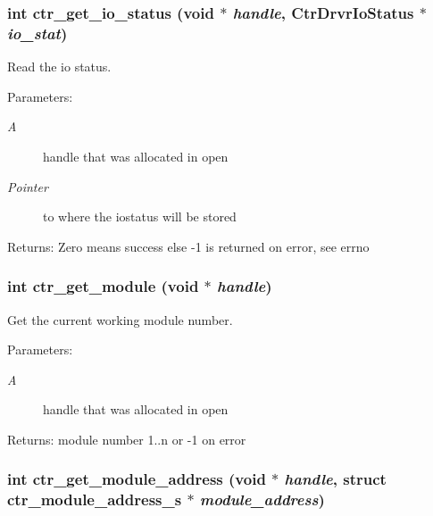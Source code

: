 \subsubsection{\setlength{\rightskip}{0pt plus 5cm}int ctr\_\-get\_\-io\_\-status (void $\ast$ {\em handle}, Ctr\-Drvr\-Io\-Status $\ast$ {\em io\_\-stat})}\label{libctr_8doxygen_d9a35d397466d9e442afbbeaa0555c55}


Read the io status. 

\begin{Desc}
\item[Parameters:]
\begin{description}
\item[{\em A}]handle that was allocated in open \item[{\em Pointer}]to where the iostatus will be stored \end{description}
\end{Desc}
\begin{Desc}
\item[Returns:]Zero means success else -1 is returned on error, see errno \end{Desc}
\subsubsection{\setlength{\rightskip}{0pt plus 5cm}int ctr\_\-get\_\-module (void $\ast$ {\em handle})}\label{libctr_8doxygen_32b534750bde200c72d807db7bbd9d16}


Get the current working module number. 

\begin{Desc}
\item[Parameters:]
\begin{description}
\item[{\em A}]handle that was allocated in open \end{description}
\end{Desc}
\begin{Desc}
\item[Returns:]module number 1..n or -1 on error \end{Desc}
\subsubsection{\setlength{\rightskip}{0pt plus 5cm}int ctr\_\-get\_\-module\_\-address (void $\ast$ {\em handle}, struct \bf{ctr\_\-module\_\-address\_\-s} $\ast$ {\em module\_\-address})}\label{libctr_8doxygen_d6f2193a2abaaffe67b0038b4daf6421}


